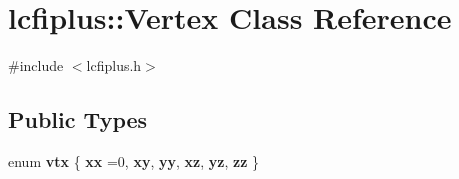 \section{lcfiplus\+:\+:Vertex Class Reference}
\label{classlcfiplus_1_1Vertex}


{\ttfamily \#include $<$lcfiplus.\+h$>$}

\subsection*{Public Types}
\begin{DoxyCompactItemize}
\item 
enum \textbf{ vtx} \{ \newline
\textbf{ xx} =0, 
\textbf{ xy}, 
\textbf{ yy}, 
\textbf{ xz}, 
\newline
\textbf{ yz}, 
\textbf{ zz}
 \}
\end{DoxyCompactItemize}
